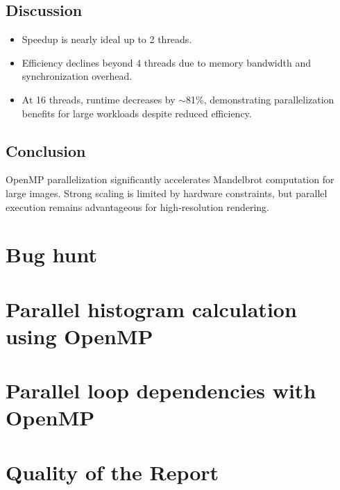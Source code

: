 \documentclass[unicode,11pt,a4paper,oneside,numbers=endperiod,openany]{scrartcl}
\begin{document}
\subsection{Discussion}
\begin{itemize}
\item Speedup is nearly ideal up to 2 threads.
\item Efficiency declines beyond 4 threads due to memory bandwidth and synchronization overhead.
\item At 16 threads, runtime decreases by $\sim$81\%, demonstrating parallelization benefits for large workloads despite reduced efficiency.
\end{itemize}

\subsection{Conclusion}
OpenMP parallelization significantly accelerates Mandelbrot computation for large images. Strong scaling is limited by hardware constraints, but parallel execution remains advantageous for high-resolution rendering.


\newpage
\section{Bug hunt }


\newpage
\section{Parallel histogram calculation using OpenMP }


\newpage
\section{Parallel loop dependencies with OpenMP }


\newpage
\section{Quality of the Report }
\end{document}
